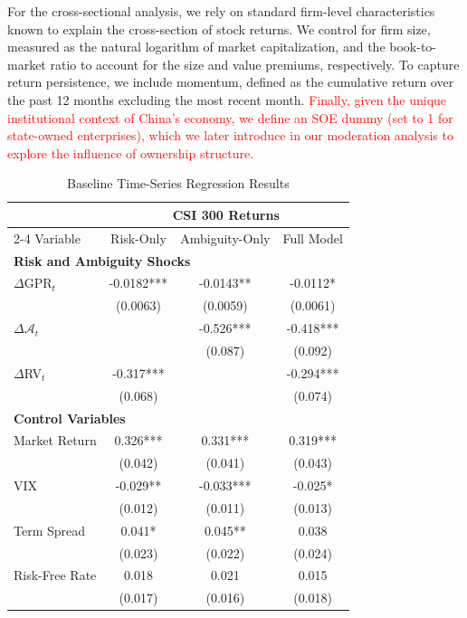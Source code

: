 \documentclass[preprint,12pt,authoryear]{elsarticle}
\begin{document}
For the cross-sectional analysis, we rely on standard firm-level characteristics known to explain the cross-section of stock returns. We control for firm size, measured as the natural logarithm of market capitalization, and the book-to-market ratio to account for the size and value premiums, respectively. To capture return persistence, we include momentum, defined as the cumulative return over the past 12 months excluding the most recent month. \textcolor{red}{Finally, given the unique institutional context of China's economy, we define an SOE dummy (set to 1 for state-owned enterprises), which we later introduce in our moderation analysis to explore the influence of ownership structure.}

\begin{table}[htbp]
\centering
\caption{Baseline Time-Series Regression Results}
\label{tab:baseline_ts}
\begin{threeparttable}
\begin{tabular*}{\textwidth}{@{\extracolsep{\fill}} lccc @{\extracolsep{\fill}}}
\toprule
& \multicolumn{3}{c}{CSI 300 Returns} \\
\cmidrule(lr){2-4}
Variable & Risk-Only & Ambiguity-Only & Full Model \\
\midrule
\midrule
\multicolumn{4}{l}{\textbf{Risk and Ambiguity Shocks}} \\
$\Delta$GPR$_t$ & -0.0182*** & -0.0143** & -0.0112* \\
& (0.0063) & (0.0059) & (0.0061) \\
$\Delta \mathcal{A}_{t}$ &  & -0.526*** & -0.418*** \\
&  & (0.087) & (0.092) \\
$\Delta$RV$_t$ & -0.317*** &  & -0.294*** \\
& (0.068) &   & (0.074) \\
\midrule
\multicolumn{4}{l}{\textbf{Control Variables}} \\
Market Return & 0.326*** & 0.331*** & 0.319*** \\
& (0.042) & (0.041) & (0.043) \\
VIX & -0.029** & -0.033*** & -0.025* \\
& (0.012) & (0.011) & (0.013) \\
Term Spread & 0.041* & 0.045** & 0.038 \\
& (0.023) & (0.022) & (0.024) \\
Risk-Free Rate & 0.018 & 0.021 & 0.015 \\
& (0.017) & (0.016) & (0.018) \\
\midrule

\end{tabular*}
\end{threeparttable}
\end{table}
\end{document}

